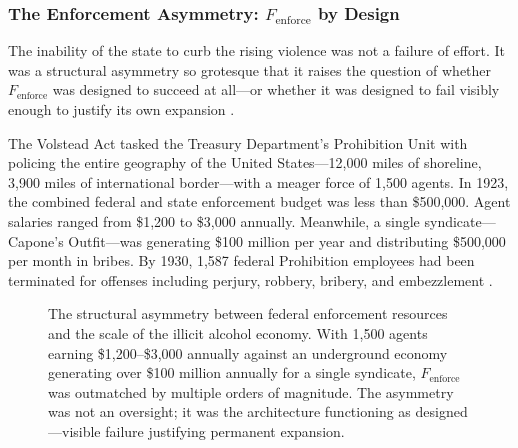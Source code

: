 \documentclass[12pt,openany]{book}
\begin{document}
\subsubsection{The Enforcement Asymmetry: $F_{\text{enforce}}$ by Design}

The inability of the state to curb the rising violence was not a failure of effort. It was a structural asymmetry so grotesque that it raises the question of whether $F_{\text{enforce}}$ was designed to succeed at all---or whether it was designed to fail visibly enough to justify its own expansion \cite{mobmuseum_agents}.

The Volstead Act tasked the Treasury Department's Prohibition Unit with policing the entire geography of the United States---12,000 miles of shoreline, 3,900 miles of international border---with a meager force of 1,500 agents. In 1923, the combined federal and state enforcement budget was less than \$500,000. Agent salaries ranged from \$1,200 to \$3,000 annually. Meanwhile, a single syndicate---Capone's Outfit---was generating \$100 million per year and distributing \$500,000 per month in bribes. By 1930, 1,587 federal Prohibition employees had been terminated for offenses including perjury, robbery, bribery, and embezzlement \cite{fjc_prohibition, mobmuseum_agents}.

\begin{figure}[htbp]
\centering
\hspace*{-0.04\textwidth}%
\caption{The structural asymmetry between federal enforcement resources and the scale of the illicit alcohol economy. With 1,500 agents earning \$1,200--\$3,000 annually against an underground economy generating over \$100 million annually for a single syndicate, $F_{\text{enforce}}$ was outmatched by multiple orders of magnitude. The asymmetry was not an oversight; it was the architecture functioning as designed---visible failure justifying permanent expansion.}
\label{fig:enforcement-asymmetry}
\end{figure}
\end{document}

